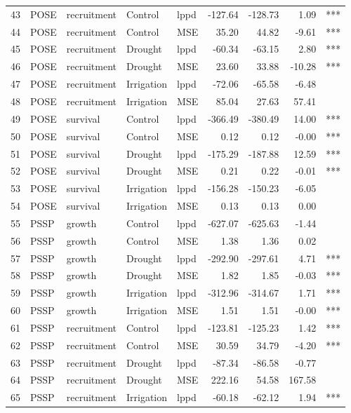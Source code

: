 \documentclass[11pt]{article}
\begin{document}
\begin{longtable}{rllllrrrl}
	43 & POSE & recruitment & Control & lppd & -127.64 & -128.73 & 1.09 & *** \\ 
	44 & POSE & recruitment & Control & MSE & 35.20 & 44.82 & -9.61 & *** \\ 
	45 & POSE & recruitment & Drought & lppd & -60.34 & -63.15 & 2.80 & *** \\ 
	46 & POSE & recruitment & Drought & MSE & 23.60 & 33.88 & -10.28 & *** \\ 
	47 & POSE & recruitment & Irrigation & lppd & -72.06 & -65.58 & -6.48 &  \\ 
	48 & POSE & recruitment & Irrigation & MSE & 85.04 & 27.63 & 57.41 &  \\ 
	49 & POSE & survival & Control & lppd & -366.49 & -380.49 & 14.00 & *** \\ 
	50 & POSE & survival & Control & MSE & 0.12 & 0.12 & -0.00 & *** \\ 
	51 & POSE & survival & Drought & lppd & -175.29 & -187.88 & 12.59 & *** \\ 
	52 & POSE & survival & Drought & MSE & 0.21 & 0.22 & -0.01 & *** \\ 
	53 & POSE & survival & Irrigation & lppd & -156.28 & -150.23 & -6.05 &  \\ 
	54 & POSE & survival & Irrigation & MSE & 0.13 & 0.13 & 0.00 &  \\ 
	55 & PSSP & growth & Control & lppd & -627.07 & -625.63 & -1.44 &  \\ 
	56 & PSSP & growth & Control & MSE & 1.38 & 1.36 & 0.02 &  \\ 
	57 & PSSP & growth & Drought & lppd & -292.90 & -297.61 & 4.71 & *** \\ 
	58 & PSSP & growth & Drought & MSE & 1.82 & 1.85 & -0.03 & *** \\ 
	59 & PSSP & growth & Irrigation & lppd & -312.96 & -314.67 & 1.71 & *** \\ 
	60 & PSSP & growth & Irrigation & MSE & 1.51 & 1.51 & -0.00 & *** \\ 
	61 & PSSP & recruitment & Control & lppd & -123.81 & -125.23 & 1.42 & *** \\ 
	62 & PSSP & recruitment & Control & MSE & 30.59 & 34.79 & -4.20 & *** \\ 
	63 & PSSP & recruitment & Drought & lppd & -87.34 & -86.58 & -0.77 &  \\ 
	64 & PSSP & recruitment & Drought & MSE & 222.16 & 54.58 & 167.58 &  \\ 
	65 & PSSP & recruitment & Irrigation & lppd & -60.18 & -62.12 & 1.94 & *** \\ 

\end{longtable}
\end{document}
